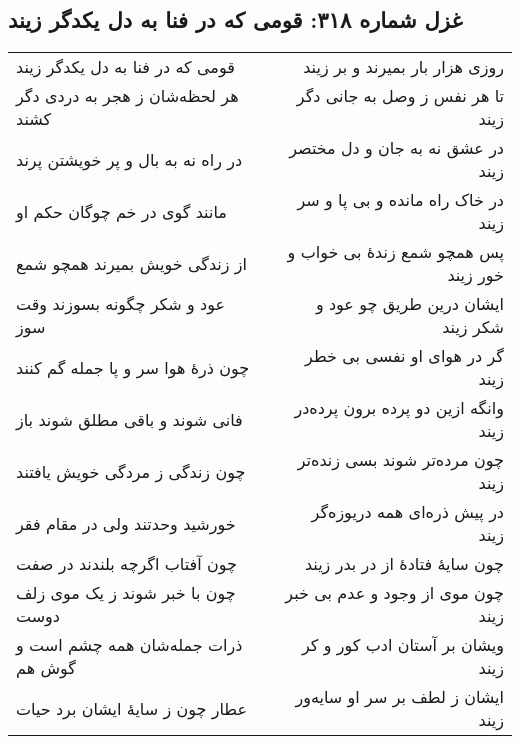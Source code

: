 \begin{center}
\section*{غزل شماره ۳۱۸: قومی که در فنا به دل یکدگر زیند}
\label{sec:318}
\begin{longtable}{l p{0.5cm} r}
قومی که در فنا به دل یکدگر زیند
&&
روزی هزار بار بمیرند و بر زیند
\\
هر لحظه‌شان ز هجر به دردی دگر کشند
&&
تا هر نفس ز وصل به جانی دگر زیند
\\
در راه نه به بال و پر خویشتن پرند
&&
در عشق نه به جان و دل مختصر زیند
\\
مانند گوی در خم چوگان حکم او
&&
در خاک راه مانده و بی پا و سر زیند
\\
از زندگی خویش بمیرند همچو شمع
&&
پس همچو شمع زندهٔ بی خواب و خور زیند
\\
عود و شکر چگونه بسوزند وقت سوز
&&
ایشان درین طریق چو عود و شکر زیند
\\
چون ذرهٔ هوا سر و پا جمله گم کنند
&&
گر در هوای او نفسی بی خطر زیند
\\
فانی شوند و باقی مطلق شوند باز
&&
وانگه ازین دو پرده برون پرده‌در زیند
\\
چون زندگی ز مردگی خویش یافتند
&&
چون مرده‌تر شوند بسی زنده‌تر زیند
\\
خورشید وحدتند ولی در مقام فقر
&&
در پیش ذره‌ای همه دریوزه‌گر زیند
\\
چون آفتاب اگرچه بلندند در صفت
&&
چون سایهٔ فتادهٔ از در بدر زیند
\\
چون با خبر شوند ز یک موی زلف دوست
&&
چون موی از وجود و عدم بی خبر زیند
\\
ذرات جمله‌شان همه چشم است و گوش هم
&&
ویشان بر آستان ادب کور و کر زیند
\\
عطار چون ز سایهٔ ایشان برد حیات
&&
ایشان ز لطف بر سر او سایه‌ور زیند
\\
\end{longtable}
\end{center}
